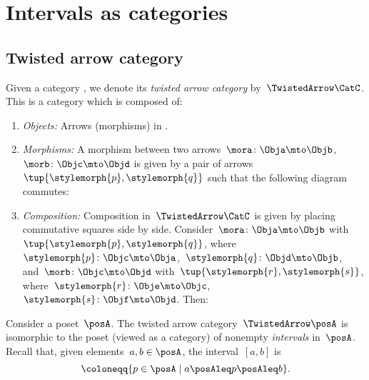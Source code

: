 
\section{Intervals as categories}

\subsection{Twisted arrow category}

\begin{ctdefinition}
    \label{def:twisted-arrow-category}
    \label{def:twisted-arrow}
    Given a category \CatC, we denote its \emph{twisted arrow category} by~$\TwistedArrow\CatC$.
    This is a category which is composed of:
    \begin{enumerate}
        \item \emph{Objects:} Arrows (morphisms) in \CatC.
        \item \emph{Morphisms:}
              A morphism between two arrows~$\mora\colon \Obja \mto \Objb $,~$\morb\colon \Objc \mto \Objd$ is given by a pair of arrows~$\tup{\stylemorph{p},\stylemorph{q}}$ such that the following diagram commutes:
              \begin{center}
              \end{center}
        \item \emph{Composition:} Composition in~$\TwistedArrow\CatC$ is given by placing commutative squares side by side.
              Consider~$\mora\colon \Obja \mto \Objb$ with~$\tup{\stylemorph{p},\stylemorph{q}}$, where~$\stylemorph{p}\colon \Objc\mto \Obja$,~$\stylemorph{q}\colon \Objd \mto \Objb$, and~$\morb\colon \Objc \mto \Objd$ with~$\tup{\stylemorph{r},\stylemorph{s}}$, where~$\stylemorph{r}\colon \Obje\mto \Objc$,~$\stylemorph{s}\colon \Objf \mto \Objd$.
              Then:
              \begin{center}
              \end{center}
    \end{enumerate}
\end{ctdefinition}


\begin{example}[Intervals]
    \label{exa:twisted-arrow-poset}
    Consider a poset~$\posA$.
    The twisted arrow category~$\TwistedArrow \posA$ is isomorphic to the poset (viewed as a category) of nonempty \emph{intervals} in~$\posA$.
    Recall that, given elements~$a, b \in \posA$, the interval~$[a,b]$ is
    \begin{equation*}
        [a,b]
        \coloneqq \{p \in \posA \mid a\posAleq p \posAleq b\}.
    \end{equation*}
\end{example}


